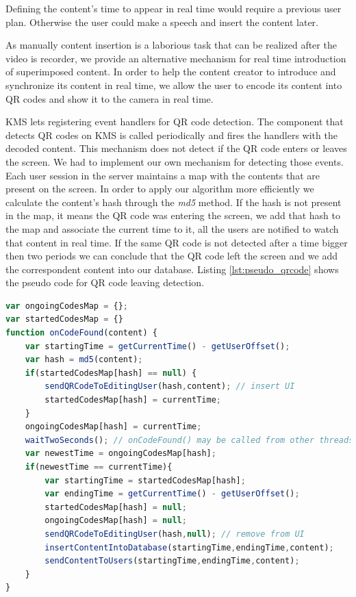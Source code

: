 	Defining the content's time to appear in real time would require a previous user plan. Otherwise the user could make a speech and insert the content later.


	As manually content insertion is a laborious task that can be realized after the video is recorder, we provide an alternative mechanism for real time introduction of superimposed content.	In order to help the content creator to introduce and synchronize its content in real time, we allow the user to encode its content into \ac{QR} codes and show it to the camera in real time.

	\ac{KMS} lets registering event handlers for \ac{QR} code detection. The component that detects \ac{QR} codes on \ac{KMS} is called periodically and fires the handlers with the decoded content. This mechanism does not detect if the \ac{QR} code enters or leaves the screen. We had to implement our own mechanism for detecting those events. Each user session in the server maintains a map with the contents that are present on the screen. In order to apply our algorithm more efficiently we calculate the content's hash through the \emph{md5} method. If the hash is not present in the map, it means the \ac{QR} code was entering the screen, we add that hash to the map and associate the current time to it, all the users are notified to watch that content in real time. If the same \ac{QR} code is not detected after a time bigger then two periods we can conclude that the \ac{QR} code left the screen and we add the correspondent content into our database. Listing \ref{lst:pseudo_qrcode} shows the pseudo code for \ac{QR} code leaving detection.

\begin{minipage}{\linewidth}
\begin{lstlisting}[caption={Pseudo code for QR code leaving detection},label={lst:pseudo_qrcode},language=JavaScript]
var ongoingCodesMap = {};
var startedCodesMap = {}
function onCodeFound(content) {
	var startingTime = getCurrentTime() - getUserOffset();
	var hash = md5(content);
	if(startedCodesMap[hash] == null) {
		sendQRCodeToEditingUser(hash,content); // insert UI
		startedCodesMap[hash] = currentTime;
	}
	ongoingCodesMap[hash] = currentTime;
	waitTwoSeconds(); // onCodeFound() may be called from other threads
	var newestTime = ongoingCodesMap[hash]; 
	if(newestTime == currentTime){
		var startingTime = startedCodesMap[hash];
		var endingTime = getCurrentTime() - getUserOffset();
		startedCodesMap[hash] = null; 
		ongoingCodesMap[hash] = null; 
		sendQRCodeToEditingUser(hash,null); // remove from UI
		insertContentIntoDatabase(startingTime,endingTime,content);
		sendContentToUsers(startingTime,endingTime,content);
	}
}
\end{lstlisting}
\end{minipage}


